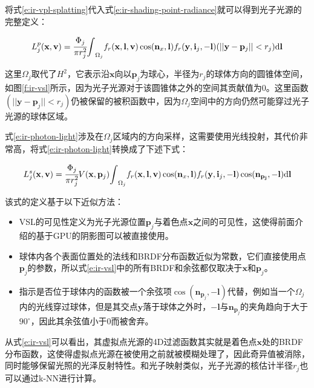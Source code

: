 将式\ref{e:ir-vpl-splatting}代入式\ref{e:ir-shading-point-radiance}就可以得到光子光源的完整定义：

\begin{equation}\label{e:ir-photon-light}
	L^{p}_j(\mathbf{x},\mathbf{v})= \cfrac{\Phi_j}{\pi r^{2}_j}{\rm \int}_{\Omega_j}f_r(\mathbf{x},\mathbf{l},\mathbf{v})\cos(\mathbf{n}_x,\mathbf{l})f_r(\mathbf{y},\mathbf{i}_j,-\mathbf{l})(||\mathbf{y}-\mathbf{p}_j||<r_j){\rm d}\mathbf{l}
\end{equation}

\noindent 这里$\Omega_j$取代了$H^{2}$，它表示沿$\mathbf{x}$向以$\mathbf{p}_j$为球心，半径为$r_j$的球体方向的圆锥体空间，如图\ref{f:ir-vsl}所示，因为光子光源对于该圆锥体之外的空间其贡献值为0。这里函数$(||\mathbf{y}-\mathbf{p}_j||<r_j)$仍被保留的被积函数中，因为$\Omega_j$空间中的方向仍然可能穿过光子光源的球体区域。

式\ref{e:ir-photon-light}涉及在$\Omega_j$区域内的方向采样，这需要使用光线投射，其代价非常高，\cite{a:VirtualSphericalLightsforMany-LightRenderingofGlossyScenes}将式\ref{e:ir-photon-light}转换成了下述下式：

\begin{equation}\label{e:ir-vsl}
	L^{s}_j(\mathbf{x},\mathbf{v})= \cfrac{\Phi_j}{\pi r^{2}_j}V(\mathbf{x},\mathbf{p}_j){\rm \int}_{\Omega_j}f_r(\mathbf{x},\mathbf{l},\mathbf{v})\cos(\mathbf{n}_x,\mathbf{l})f_r(\mathbf{y},\mathbf{i}_j,-\mathbf{l})\cos(\mathbf{n_{\mathbf{p}_j}},-\mathbf{l}){\rm d}\mathbf{l}
\end{equation}

\noindent 该式的定义基于以下近似方法：

\begin{itemize}
	\item VSL的可见性定义为光子光源位置$\mathbf{p}_j$与着色点$\mathbf{x}$之间的可见性，这使得前面介绍的基于GPU的阴影图可以被直接使用。
	\item 球体内各个表面位置处的法线和BRDF分布函数近似为常数，它们直接使用点$\mathbf{p}_j$的参数，所以式\ref{e:ir-vsl}中的所有BRDF和余弦都仅取决于$\mathbf{x}$和$\mathbf{p}_j$。
	\item 指示是否位于球体内的函数被一个余弦项$\cos(\mathbf{n}_{\mathbf{p}_j},-\mathbf{l})$代替，例如当一个$\Omega_j$内的光线穿过球体，但是其交点$\mathbf{y}$落于球体之外时，$-\mathbf{l}$与$\mathbf{n}_{\mathbf{p}_j}$的夹角趋向于大于$90^{\circ}$，因此其余弦值小于0而被舍弃。
\end{itemize}

从式\ref{e:ir-vsl}可以看出，其虚拟点光源的4D过滤函数其实就是着色点$\mathbf{x}$处的BRDF分布函数，这使得虚拟点光源在被使用之前就被模糊处理了，因此奇异值被消除，同时能够保留光照的光泽反射特性。和光子映射类似，光子光源的核估计半径$r_j$也可以通过k-NN进行计算。

